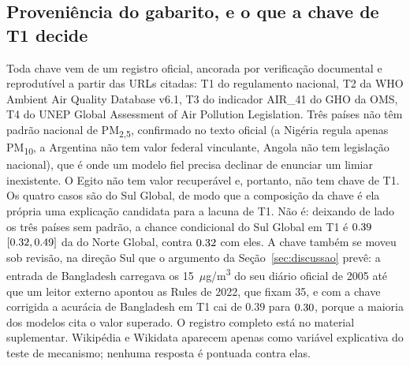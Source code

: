 \subsection{Proveniência do gabarito, e o que a chave de T1 decide}
\label{sec:res:proveniencia}
\label{sec:res:t1}

Toda chave vem de um registro oficial, ancorada por verificação documental e
reprodutível a partir das URLs citadas: T1 do regulamento nacional, T2 da WHO
Ambient Air Quality Database v6.1, T3 do indicador AIR\_41 do GHO da OMS, T4 do
UNEP Global Assessment of Air Pollution Legislation. Três países não têm padrão
nacional de PM\textsubscript{2,5}, confirmado no texto oficial (a Nigéria
regula apenas PM\textsubscript{10}, a Argentina não tem valor federal
vinculante, Angola não tem legislação nacional), que é onde um modelo fiel
precisa declinar de enunciar um limiar inexistente. O Egito não tem valor
recuperável e, portanto, não tem chave de T1. Os quatro casos são do Sul
Global, de modo que a composição da chave é ela própria uma explicação
candidata para a lacuna de T1. Não é: deixando de lado os três países sem
padrão, a chance condicional do Sul Global em T1 é $0.39$ $[0.32,0.49]$ da
do Norte Global, contra $0.32$ com eles. A chave também se moveu sob revisão,
na direção Sul que o argumento da Seção~\ref{sec:discussao} prevê: a entrada de
Bangladesh carregava os 15~$\mu$g/m\textsuperscript{3} do seu diário oficial de
2005 até que um leitor externo apontou as Rules de 2022, que fixam 35, e com a
chave corrigida a acurácia de Bangladesh em T1 cai de $0.39$ para $0.30$,
porque a maioria dos modelos cita o valor superado. O registro completo está no
material suplementar. Wikipédia e Wikidata aparecem apenas como variável
explicativa do teste de mecanismo; nenhuma resposta é pontuada contra elas.

